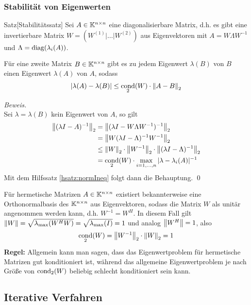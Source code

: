 \subsubsection{Stabilität von Eigenwerten}

\begin{colbox}{Satz}[Stabilitätssatz]
  Sei $A\in\mathbb K^{n\times n}$ eine diagonalisierbare Matrix, d.h. es gibt eine invertierbare Matrix 
  $W=(W^{(1)}|\dots|W^{(2)})$ aus Eigenvektoren mit $A=W\Lambda W^{-1}$ und $\Lambda=\operatorname*{diag}(\lambda_i(A))$.
  
  Für eine zweite Matrix $B\in\mathbb K^{n\times n}$ gibt es zu 
  jedem Eigenwert $\lambda(B)$ von $B$ einen Eigenwert $\lambda(A)$ von $A$, sodass
  \begin{align*}
    |\lambda(A)-\lambda(B)|\leq\cond_2(W)\cdot\vertn{2}{A-B}_2
  \end{align*}
\end{colbox}

\textit{Beweis.} \\
Sei $\lambda=\lambda(B)$ kein Eigenwert von $A$, so gilt 
%
\begin{align*}
  \vertn{2}{(\lambda I - A)^{-1}}_2 
  &= \vertn{2}{(\lambda I - W\Lambda W^{-1})^{-1}}_2 \\
  &= \vertn{2}{W(\lambda I - \Lambda)^{-1}W^{-1}}_2 \\
  &\leq \vertn{2}{W}_2\cdot\vertn{2}{W^{-1}}_2\cdot\vertn{2}{(\lambda I-\Lambda)^{-1}}_2\\
  &= \cond_2(W)\cdot \max_{i=1,\dots,n} |\lambda-\lambda_i(A)|^{-1}
\end{align*}
%
Mit dem Hilfssatz \ref{hsatz:normIneq} folgt dann die Behauptung. 
\qed 

Für hermetische Matrizen $A\in\mathbb K^{n\times n}$ existiert bekannterweise eine Orthonormalbasis des 
$\mathbb K^{n\times n}$ aus Eigenvektoren, sodass die Matrix $W$ als unitär angenommen werden kann, 
d.h. $W^{-1}=W^H$. In diesem Fall gilt $\vertn{2}{W} = \sqrt{\lambda_{\max}(W^HW)} = \sqrt{\lambda_{\max}(I)}=1$
und analog $\vertn{2}{W^H} = 1$, also 
%
\begin{align*}
  \cond_2(W)=\vertn{2}{W^{-1}}_2\cdot\vertn{2}{W}_2 = 1
\end{align*}
%
\textbf{Regel:} Allgemein kann man sagen, dass das Eigenwertproblem für hermetische Matrizen gut konditioniert
ist, während das allgemeine Eigenwertproblem je nach Größe von $\operatorname*{cond}_2(W)$ beliebig schlecht konditioniert 
sein kann.

\subsection{Iterative Verfahren}

